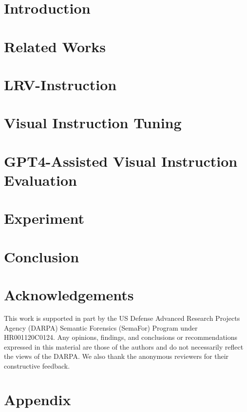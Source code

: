 \documentclass{article} %
\begin{document}
\section{Introduction}

\label{sec:Introduction}

\section{Related Works}

\label{sec:related_work}


\section{LRV-Instruction}

\label{sec:dataset}

\section{Visual Instruction Tuning}

\label{sec:method}

\section{GPT4-Assisted Visual Instruction Evaluation}

\label{sec:Evaluation}

\section{Experiment}

\label{sec:Experiment}

\section{Conclusion}

\label{sec:Conclusion}

\section{Acknowledgements}
This work is supported in part by the US Defense Advanced Research Projects Agency (DARPA) Semantic Forensics (SemaFor) Program under HR001120C0124. Any opinions,
findings, and conclusions or recommendations expressed in
this material are those of the authors and do not necessarily reflect the views of the DARPA. We also thank the anonymous reviewers for their constructive feedback. 






\clearpage
\appendix
\section{Appendix}

\label{sec:appendix}
\end{document}
